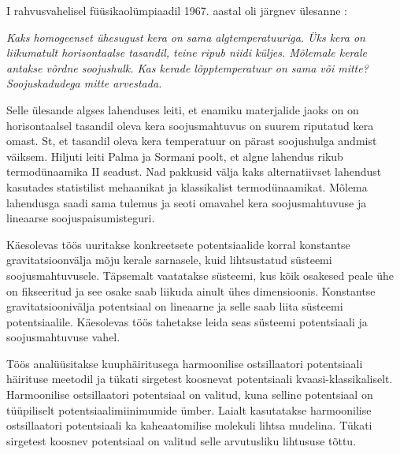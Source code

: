 \documentclass{trkut}%
\begin{document}
\maketitle%
\tableofcontents%
\nummerdame%
I rahvusvahelisel füüsikaolümpiaadil 1967. aastal oli järgnev ülesanne \parencite[6]{ipho67}:

\textit{Kaks homogeenset ühesugust kera on sama algtemperatuuriga. Üks kera on liikumatult horisontaalse tasandil, teine ripub niidi küljes. Mõlemale kerale antakse võrdne soojushulk. Kas kerade lõpptemperatuur on sama või mitte? Soojuskadudega mitte arvestada.}

Selle ülesande algses lahenduses leiti, et enamiku materjalide jaoks on on horisontaalsel tasandil oleva kera soojusmahtuvus on suurem riputatud kera omast.
St, et tasandil oleva kera temperatuur on pärast soojushulga andmist väiksem.
Hiljuti leiti Palma ja Sormani poolt, et algne lahendus rikub termodünaamika II seadust.
Nad pakkusid välja kaks alternatiivset lahendust kasutades statistilist mehaanikat ja klassikalist termodünaamikat.
Mõlema lahendusga saadi sama tulemus ja seoti omavahel kera soojusmahtuvuse ja lineaarse soojuspaisumisteguri.

Käesolevas töös uuritakse konkreetsete potentsiaalide korral konstantse gravitatsioonvälja mõju kerale sarnasele, kuid lihtsustatud süsteemi soojusmahtuvusele.
Täpsemalt vaatatakse süsteemi, kus kõik osakesed peale ühe on fikseeritud ja see osake saab liikuda ainult ühes dimensioonis.
Konstantse gravitatsioonivälja potentsiaal on lineaarne ja selle saab liita süsteemi potentsiaalile.
Käesolevas töös tahetakse leida seas süsteemi potentsiaali ja soojusmahtuvuse vahel.

Töös analüüsitakse kuuphäiritusega harmoonilise ostsillaatori potentsiaali häirituse meetodil ja tükati sirgetest koosnevat potentsiaali kvaasi-klassikaliselt.
Harmoonilise ostsillaatori potentsiaal on valitud, kuna selline potentsiaal on tüüpiliselt potentsiaalimiinimumide ümber.
Laialt kasutatakse harmoonilise ostsillaatori potentsiaali ka kaheaatomilise molekuli lihtsa mudelina.
Tükati sirgetest koosnev potentsiaal on valitud selle arvutusliku lihtususe tõttu.

\end{document}
